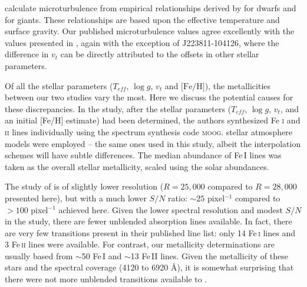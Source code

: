 \documentclass{emulateapj}
\begin{document}
\citet{wylie-de-boer;et-al_2012} calculate microturbulence from empirical relationships derived by \citet{Reddy;et-al_2003} for dwarfs and \citet{fulbright_2000} for giants. These relationships are based upon the effective temperature and surface gravity. Our published microturbulence values agree excellently with the values presented in \citet{wylie-de-boer;et-al_2012}, again with the exception of J223811-104126, where the difference in $v_{t}$ can be  directly attributed to the offsets in other stellar parameters.

Of all the stellar parameters ($T_{eff}$, $\log{g}$, $v_{t}$ and $\mbox{[Fe/H]}$), the metallicities between our two studies vary the most. Here we discuss the potential causes for these discrepancies. In the \citet{wylie-de-boer;et-al_2012} study, after the stellar parameters ($T_{eff}$, $\log{g}$, $v_{t}$, and an initial [Fe/H] estimate) had been determined, the authors synthesized Fe \textsc{i} and \textsc{ii} lines individually using the spectrum synthesis code \textsc{moog}. \citet{castelli;kurucz_2003} stellar atmosphere models were employed \--- the same ones used in this study, albeit the interpolation schemes will have subtle differences. The median abundance of Fe\,I lines was taken as the overall stellar metallicity, scaled using the \citet{grevesse;sauval_1998} solar abundances.

The study of \citet{wylie-de-boer;et-al_2012} is of slightly lower resolution ($R = 25,000$ compared to $R = 28,000$ presented here), but with a much lower $S/N$ ratio: $\sim{}25$ pixel$^{-1}$ compared to $>100$ pixel$^{-1}$ achieved here. Given the lower spectral resolution and modest $S/N$ in the \citet{wylie-de-boer;et-al_2012} study, there are fewer unblended absorption lines available. In fact, there are very few transitions present in their published line list: only 14 Fe\,\textsc{i} lines and 3 Fe\,\textsc{ii} lines were available. For contrast, our metallicity determinations are usually based from ${\sim}$50 Fe\,I and ${\sim}$13 Fe\,II lines. Given the metallicity of these stars and the spectral coverage (4120 to 6920 {\AA}), it is somewhat surprising that there were not more unblended transitions available to \citet{wylie-de-boer;et-al_2012}. 
\end{document}
